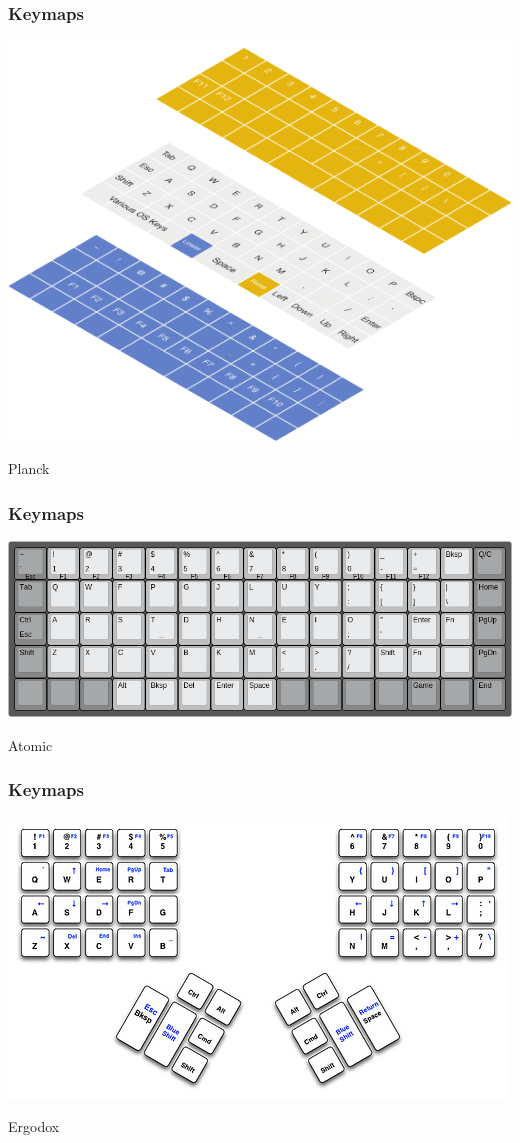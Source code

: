 \documentclass{beamer}
\begin{document}
\begin{frame}
  \frametitle{Keymaps}
  \includegraphics[scale=0.5]{images/planck}

  Planck
\end{frame}

\begin{frame}
  \frametitle{Keymaps}
  \includegraphics[scale=0.35]{images/atomic-layout}

  Atomic
\end{frame}

\begin{frame}
  \frametitle{Keymaps}
  \includegraphics[scale=0.5]{images/ergodox-layout}

  Ergodox
\end{frame}
\end{document}
